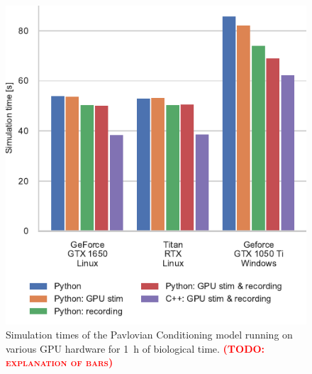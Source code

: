 \documentclass[utf8]{frontiersSCNS} %
\newcommand{\todo}[1]{\textbf{\textsc{\textcolor{red}{(TODO: #1)}}}}
\begin{document}
\begin{figure}[t!]
    \begin{center}
        \includegraphics{figures/izhikevich.pdf}
    \end{center}
    \caption{Simulation times of the Pavlovian Conditioning model running on various GPU hardware for \SI{1}{\hour} of biological time.
             \todo{explanation of bars}}
    \label{fig:izhikevich}
\end{figure}
%
\end{document}
